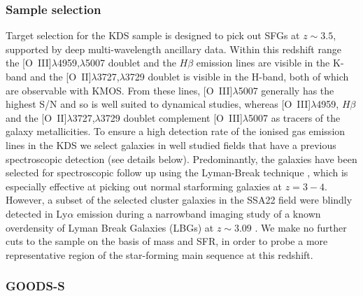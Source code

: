 \documentclass[fleqn,usenatbib]{mn2e}
\begin{document}
\subsubsection{Sample selection}\label{subsubsec:sample_selection}
Target selection for the KDS sample is designed to pick out SFGs at $z \sim 3.5$, supported by deep multi-wavelength ancillary data.
Within this redshift range the [O~{\sc III}]$\lambda$4959,$\lambda$5007 doublet and the $H\beta$ emission lines are visible in the K-band and the [O~{\sc II}]$\lambda$3727,$\lambda$3729 doublet is visible in the H-band, both of which are observable with KMOS.
From these lines, [O~{\sc III}]$\lambda$5007 generally has the highest S/N and so is well suited to dynamical studies, whereas [O~{\sc III}]$\lambda$4959, $H\beta$ and the [O~{\sc II}]$\lambda$3727,$\lambda$3729 doublet complement [O~{\sc III}]$\lambda$5007 as tracers of the galaxy metallicities. 
To ensure a high detection rate of the ionised gas emission lines in the KDS we select galaxies in well studied fields that have a previous spectroscopic detection (see details below).
Predominantly, the galaxies have been selected for spectroscopic follow up using the Lyman-Break technique \citep{Steidel1996}, which is especially effective at picking out normal starforming galaxies at $z = 3-4$.
However, a subset of the selected cluster galaxies in the SSA22 field were blindly detected in Ly$\alpha$ emission during a narrowband imaging study of a known overdensity of Lyman Break Galaxies (LBGs) at $z \sim 3.09$ \citep{Steidel2000}.
We make no further cuts to the sample on the basis of mass and SFR, in order to probe a more representative region of the star-forming main sequence at this redshift.

\subsubsection{GOODS-S}\label{subsubsec:sample_selection_goods}
\end{document}
